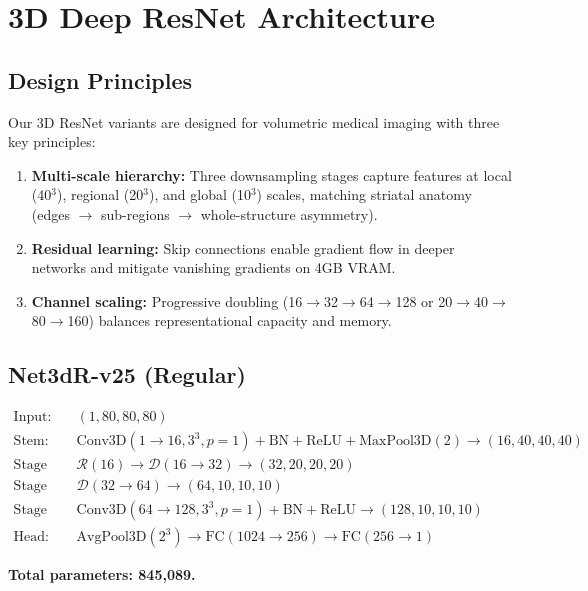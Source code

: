 \section{3D Deep ResNet Architecture}
\label{sec:model_arch}

\subsection{Design Principles}
\label{sec:design_principles}

Our 3D ResNet variants are designed for volumetric medical imaging with three key principles:
\begin{enumerate}
    \item \textbf{Multi-scale hierarchy:} Three downsampling stages capture features at local (40$^3$), regional (20$^3$), and global (10$^3$) scales, matching striatal anatomy (edges $\to$ sub-regions $\to$ whole-structure asymmetry).
    \item \textbf{Residual learning:} Skip connections enable gradient flow in deeper networks and mitigate vanishing gradients on 4GB VRAM.
    \item \textbf{Channel scaling:} Progressive doubling (16$\to$32$\to$64$\to$128 or 20$\to$40$\to$80$\to$160) balances representational capacity and memory.
\end{enumerate}

\subsection{Net3dR-v25 (Regular)}
\label{sec:net3dr}

\begin{align*}
\text{Input:} &\quad (1, 80, 80, 80) \\
\text{Stem:} &\quad \text{Conv3D}(1\!\to\!16, 3^3, p=1) + \text{BN} + \text{ReLU} + \text{MaxPool3D}(2) \to (16, 40, 40, 40) \\
\text{Stage 1:} &\quad \mathcal{R}(16) \to \mathcal{D}(16\!\to\!32) \to (32, 20, 20, 20) \\
\text{Stage 2:} &\quad \mathcal{D}(32\!\to\!64) \to (64, 10, 10, 10) \\
\text{Stage 3:} &\quad \text{Conv3D}(64\!\to\!128, 3^3, p=1) + \text{BN} + \text{ReLU} \to (128, 10, 10, 10) \\
\text{Head:} &\quad \text{AvgPool3D}(2^3) \to \text{FC}(1024\!\to\!256) \to \text{FC}(256\!\to\!1)
\end{align*}

\textbf{Total parameters: 845,089.}

